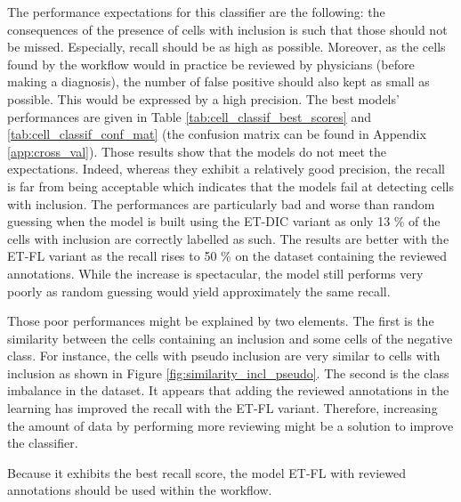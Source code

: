The performance expectations for this classifier are the following: the consequences of the presence of cells with inclusion is such that those should not be missed. Especially, recall should be as high as possible. Moreover, as the cells found by the workflow would in practice be reviewed by physicians (before making a diagnosis), the number of false positive should also kept as small as possible. This would be expressed by a high precision. The best models' performances are given in Table \ref{tab:cell_classif_best_scores} and \ref{tab:cell_classif_conf_mat} (the confusion matrix can be found in Appendix \ref{app:cross_val}). Those results show that the models do not meet the expectations. Indeed, whereas they exhibit a relatively good precision, the recall is far from being acceptable which indicates that the models fail at detecting cells with inclusion. The performances are particularly bad and worse than random guessing when the model is built using the ET-DIC variant as only 13 \% of the cells with inclusion are correctly labelled as such. The results are better with the ET-FL variant as the recall rises to 50 \% on the dataset containing the reviewed annotations. While the increase is spectacular, the model still performs very poorly as random guessing would yield approximately the same recall. 

Those poor performances might be explained by two elements. The first is the similarity between the cells containing an inclusion and some cells of the negative class. For instance, the cells with pseudo inclusion are very similar to cells with inclusion as shown in Figure \ref{fig:similarity_incl_pseudo}. The second is the class imbalance in the dataset. It appears that adding the reviewed annotations in the learning has improved the recall with the ET-FL variant. Therefore, increasing the amount of data by performing more reviewing might be a solution to improve the classifier. 

Because it exhibits the best recall score, the model ET-FL with reviewed annotations should be used within the workflow.

